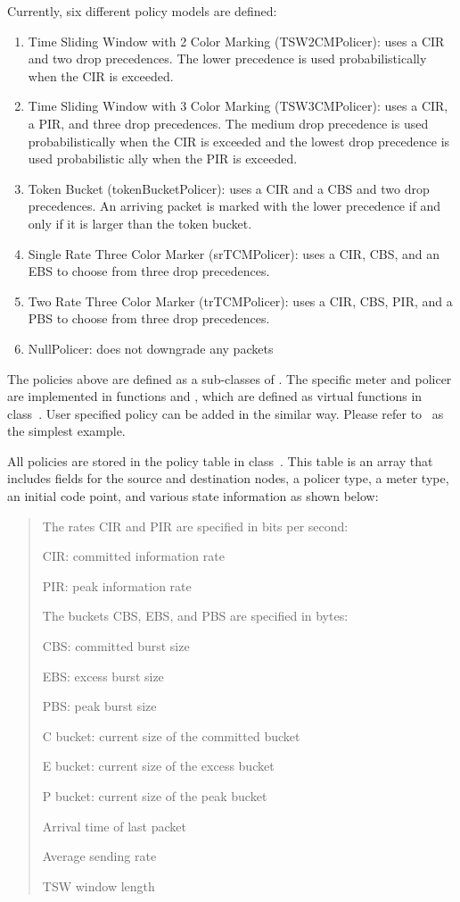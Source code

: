 Currently, six different policy models are defined:
\begin{enumerate}
\item
Time Sliding Window with 2 Color Marking (TSW2CMPolicer): 
  uses a CIR and two drop precedences.  
The lower precedence is used probabilistically when the CIR is exceeded.
\item
Time Sliding Window with 3 Color Marking (TSW3CMPolicer): 
  uses a CIR, a PIR, and three drop precedences.  
The medium drop precedence is used probabilistically 
  when the CIR is exceeded and the lowest drop precedence is used 
  probabilistic ally when the PIR is exceeded.
\item
Token Bucket (tokenBucketPolicer): 
  uses a CIR and a CBS and two drop precedences.  
An arriving packet is marked with the lower precedence if and 
  only if it is larger than the token bucket.
\item
Single Rate Three Color Marker (srTCMPolicer): 
  uses a CIR, CBS, and an EBS to choose from three drop precedences.
\item
Two Rate Three Color Marker (trTCMPolicer): 
  uses a CIR, CBS, PIR, and a PBS to choose from three drop precedences.
\item
NullPolicer: does not downgrade any packets
\end{enumerate}

The policies above are defined as a sub-classes of .
The specific meter and policer are implemented in functions 
   and ,
  which are defined as virtual functions in class~.
User specified policy can be added in the similar way.
Please refer to~ as the simplest example.

All policies are stored in the policy table in class~.
This table is an array that includes fields for 
  the source and destination nodes, 
  a policer type, a meter type, 
  an initial code point, and various state information as shown below:

\begin{quote}
The rates CIR and PIR are specified in bits per second:

CIR: committed information rate

PIR: peak information rate

The buckets CBS, EBS, and PBS are specified in bytes:

CBS: committed burst size

EBS: excess burst size

PBS: peak burst size

C bucket: current size of the committed bucket

E bucket: current size of the excess bucket

P bucket: current size of the peak bucket

Arrival time of last packet

Average sending rate

TSW window length

\end{quote}


